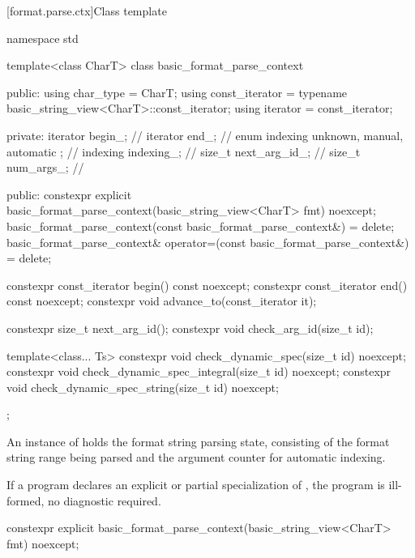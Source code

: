 [format.parse.ctx]{Class template }

%
%
%
%
\begin{codeblock}
namespace std {
  template<class CharT>
  class basic_format_parse_context {
  public:
    using char_type = CharT;
    using const_iterator = typename basic_string_view<CharT>::const_iterator;
    using iterator = const_iterator;

  private:
    iterator begin_;                                    // \expos
    iterator end_;                                      // \expos
    enum indexing { unknown, manual, automatic };       // \expos
    indexing indexing_;                                 // \expos
    size_t next_arg_id_;                                // \expos
    size_t num_args_;                                   // \expos

  public:
    constexpr explicit basic_format_parse_context(basic_string_view<CharT> fmt) noexcept;
    basic_format_parse_context(const basic_format_parse_context&) = delete;
    basic_format_parse_context& operator=(const basic_format_parse_context&) = delete;

    constexpr const_iterator begin() const noexcept;
    constexpr const_iterator end() const noexcept;
    constexpr void advance_to(const_iterator it);

    constexpr size_t next_arg_id();
    constexpr void check_arg_id(size_t id);

    template<class... Ts>
      constexpr void check_dynamic_spec(size_t id) noexcept;
    constexpr void check_dynamic_spec_integral(size_t id) noexcept;
    constexpr void check_dynamic_spec_string(size_t id) noexcept;
  };
}
\end{codeblock}

\pnum
An instance of  holds
the format string parsing state, consisting of
the format string range being parsed and
the argument counter for automatic indexing.

\pnum
If a program declares an explicit or partial specialization of
,
the program is ill-formed, no diagnostic required.

%
\begin{itemdecl}
constexpr explicit basic_format_parse_context(basic_string_view<CharT> fmt) noexcept;
\end{itemdecl}

